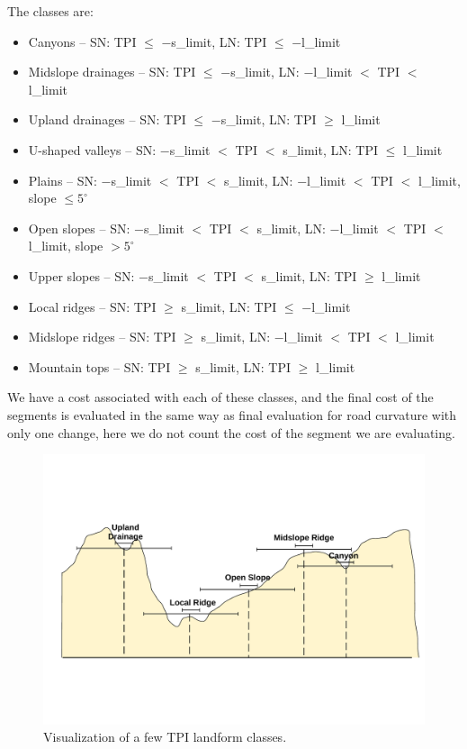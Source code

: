 \documentclass[oneside]{article}
\begin{document}
        \noindent The classes are:
        \begin{itemize}
            \item Canyons -- SN: TPI $\le$ $-$s\_limit, LN: TPI $\le$ $-$l\_limit
            \item Midslope drainages -- SN: TPI $\le$ $-$s\_limit, LN: $-$l\_limit $<$ TPI $<$ l\_limit
            \item Upland drainages -- SN: TPI $\le$ $-$s\_limit, LN: TPI $\ge$ l\_limit
            \item U-shaped valleys -- SN: $-$s\_limit $<$ TPI $<$ s\_limit, LN: TPI $\le$ l\_limit
            \item Plains -- SN: $-$s\_limit $<$ TPI $<$ s\_limit, LN: $-$l\_limit $<$ TPI $<$ l\_limit, slope $\le5^{\circ}$
            \item Open slopes -- SN: $-$s\_limit $<$ TPI $<$ s\_limit, LN: $-$l\_limit $<$ TPI $<$ l\_limit, slope $>5^{\circ}$
            \item Upper slopes -- SN: $-$s\_limit $<$ TPI $<$ s\_limit, LN: TPI $\ge$ l\_limit
            \item Local ridges -- SN: TPI $\ge$ s\_limit, LN: TPI $\le$ $-$l\_limit
            \item Midslope ridges -- SN: TPI $\ge$ s\_limit, LN: $-$l\_limit $<$ TPI $<$ l\_limit
            \item Mountain tops -- SN: TPI $\ge$ s\_limit, LN: TPI $\ge$ l\_limit
        \end{itemize}

        We have a cost associated with each of these classes, and the final cost of the segments is evaluated in the same way as final evaluation for road curvature with only one change, here we do not count the cost of the segment we are evaluating.

        \begin{figure}[H]
            \centering
            \includegraphics[trim={1.5cm 5.2cm 1.2cm 5.4cm}, clip, width=\linewidth]{TPI_classification.pdf}
            \caption{Visualization of a few TPI landform classes.}
            \label{fig:TPI}
        \end{figure}
\end{document}
